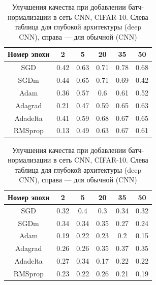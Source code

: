 \documentclass[12pt]{article}
\begin{document}
\begin{table}[h!]
\centering

\begin{minipage}{0.45\linewidth}
\begin{tabular}{|c|c|c|c|c|c|}\hline
\textbf{Номер эпохи} & \textbf{2} & \textbf{5} & \textbf{20} & \textbf{35} & \textbf{50} \\\hline
SGD & 0.42 & 0.63 & 0.71 & 0.78 & 0.68 \\\hline

SGDm & 0.44 & 0.65 & 0.71 & 0.69 & 0.42 \\\hline

Adam & 0.36 & 0.57 & 0.6 & 0.61 & 0.52 \\\hline

Adagrad & 0.21 & 0.47 & 0.59 & 0.65 & 0.63 \\\hline

Adadelta & 0.41 & 0.59 & 0.68 & 0.67 & 0.65 \\\hline

RMSprop & 0.13 & 0.49 & 0.63 & 0.67 & 0.61 \\\hline

\end{tabular}
\end{minipage} \hfill
\begin{minipage}{0.45\linewidth}
\begin{tabular}{|c|c|c|c|c|c|}\hline
\textbf{Номер эпохи} & \textbf{2} & \textbf{5} & \textbf{20} & \textbf{35} & \textbf{50} \\\hline
SGD & 0.32 & 0.4 & 0.3 & 0.34 & 0.32 \\\hline

SGDm & 0.34 & 0.34 & 0.35 & 0.27 & 0.24 \\\hline

{Adam} & {0.19} & {0.22} & {0.23} &{ 0.2} & {0.15} \\\hline

Adagrad & {0.26} & {0.26} & 0.35 & 0.37 & 0.35 \\\hline

{Adadelta} & 0.27 & 0.34 & {0.17} & {0.22} & {0.22} \\\hline

{RMSprop} & {0.23} & {0.22} & {0.26} & {0.21} & {0.19} \\\hline
\end{tabular}
\end{minipage}
\caption{\small Улучшения качества при добавлении батч-нормализации в сеть CNN, CIFAR-10. Слева таблица для глубокой архитектуры (deep CNN), справа --- для обычной (CNN)} \label{table:6.cnn}
\end{table}
\end{document}
